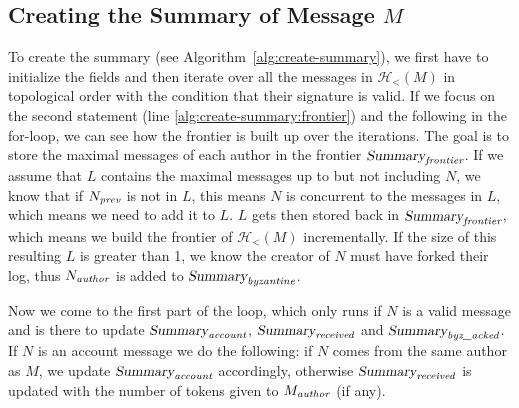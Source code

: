\subsection{Creating the Summary of Message \(M\)}
To create the summary (see Algorithm~\ref{alg:create-summary}), we first have to initialize the fields and then iterate over all the messages in $\mathcal H_<(M)$ in topological order with the condition that their signature is valid. If we focus on the second statement (line \ref{alg:create-summary:frontier}) and the following in the for-loop, we can see how the frontier is built up over the iterations. The goal is to store the maximal messages of each author in the frontier $\textsl{Summary}_\emph{frontier}$. If we assume that $L$ contains the maximal messages up to but not including $N$, we know that if $N_\emph{prev}$ is not in $L$, this means $N$ is concurrent to the messages in $L$, which means we need to add it to $L$. $L$ gets then stored back in $\textsl{Summary}_\emph{frontier}$, which means we build the frontier of $\mathcal H_<(M)$ incrementally. If the size of this resulting $L$ is greater than 1, we know the creator of $N$ must have forked their log, thus $N_\emph{author}$ is added to $\textsl{Summary}_\emph{byzantine}$.

Now we come to the first part of the loop, which only runs if $N$ is a valid message and is there to update $\textsl{Summary}_\emph{account}$, $\textsl{Summary}_\emph{received}$ and $\textsl{Summary}_\emph{byz\_acked}$. If $N$ is an account message we do the following: if $N$ comes from the same author as $M$, we update $\textsl{Summary}_\emph{account}$ accordingly, otherwise $\textsl{Summary}_\emph{received}$ is updated with the number of tokens given to $M_\emph{author}$ (if any).

